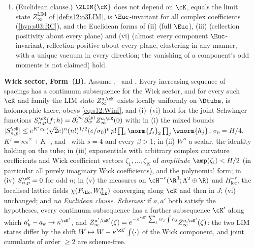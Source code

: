 \begin{theorem}
\begin{enumerate}[label=\textup{(\roman*)},leftmargin=*,nosep]
\item \textup{(Euclidean clause.)} $\ZLIM{\cK}$ does not depend on $\cK$, equals the limit state $Z^{\mathrm{LIM}}_\infty$ of \cref{def:s12:o3LIM}, is $\Euc$-invariant for all complex coefficients (\cref{hyp:s03:RC}), and the Euclidean forms of (ii) (full $\Euc$), (iii) (reflection positivity about every plane) and (vi) (almost every component $\Euc$-invariant, reflection positive about every plane, clustering in any manner, with a unique vacuum in every direction; the vanishing of a component's odd moments is not claimed) hold.
\end{enumerate}

\textbf{Wick sector, Form~(B).} Assume \Tthree, \Bcell\ and \SCH. Every increasing sequence of spacings has a continuum subsequence for the Wick sector, and for every such $\cK$ and family the LIM state $Z^{a,\cK}_\infty$ exists locally uniformly on $\Dtube$, is holomorphic there, obeys \eqref{eq:s12:Winf}, and (i)--(vi) hold for the joint Schwinger functions $S^{\cK}_{n,p}(f;h)=\partial^{(n)}_z\partial^{(p)}_wZ^{a,\cK}_\infty(0)$ with: in (i) the mixed bounds $|S^{\cK}_{n,p}|\le e^{K'\sigma_0}(\sqrt2e)^n(n!)^{1/2}(e/\sigma_0)^p\,p!\prod_i\norm{f_i}_2\prod_j\wnorm{h_j}$, $\sigma_0=H/4$, $K'=\kappa\pi^2+K_-$, and \Ezz\ with $s=4$ and every $\beta>1$; in (ii) $W^a$ a scalar, the identity holding on the tube; in (iii) exponentials with arbitrary complex curvature coefficients and Wick coefficient vectors $\zeta_1,\dots,\zeta_N$ of \emph{amplitude $\amp(\zeta_i)<H/2$} (in particular all purely imaginary Wick coefficients), and the polynomial form; in (iv) $S^{\cK}_{n,p}=0$ for odd $n$; in (v) the measures on $\cH^{-r}(\R^3;\Lambda^2\oplus\R)$ and $H^{-r}_{\mathrm{loc}}$, the localised lattice fields $\chi(F_{\Lk},W^a_{\Lk})$ converging along $\cK$ and then in $J$; (vi) unchanged; and \emph{no Euclidean clause}. \emph{Schemes:} if $a,a'$ both satisfy the hypotheses, every continuum subsequence has a further subsequence $\cK'$ along which $a'_k-a_k\to\kappa^{\cK'}$, and $Z^{a',\cK'}_\infty(\zeta)=e^{-\kappa^{\cK'}\sum_jw_j\int h_j}Z^{a,\cK'}_\infty(\zeta)$: the two LIM states differ by the shift $W\mapsto W-\kappa^{\cK'}\int(\cdot)$ of the Wick component, and joint cumulants of order $\ge2$ are scheme-free.
\end{theorem}

